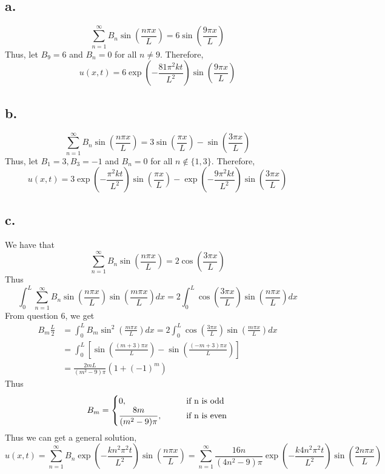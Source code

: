 \documentclass[11pt]{article}
\theoremstyle{mystyle}
\theoremstyle{definition}
\begin{document}
\subsection*{a.}
\[
  \sum_{n=1}^\infty B_n \sin\left( \displaystyle\frac{n\pi x}{L} \right) = 6\sin\left( \displaystyle\frac{9\pi x}{L}\right) 
\]
Thus, let $B_9 = 6$ and $B_n = 0$ for all $n \ne 9$. 
Therefore, 
\[
  u(x,t) = 6 \exp \left(-\displaystyle\frac{81\pi^2kt}{L^2}\right) \sin\left( \displaystyle\frac{9\pi x}{L}\right)
\]
\subsection*{b.}
\[
  \sum_{n=1}^\infty B_n \sin\left( \displaystyle\frac{n\pi x}{L} \right) = 3\sin\left( \displaystyle\frac{\pi x}{L}\right) - \sin\left( \displaystyle\frac{3\pi x}{L}\right) 
\]
Thus, let $B_1 = 3, B_3 = -1$ and $B_n = 0$ for all $n \notin \{1,3\}$. Therefore, 
\[
  u(x,t) = 3 \exp \left(-\displaystyle\frac{\pi^2kt}{L^2}\right) \sin\left( \displaystyle\frac{\pi x}{L}\right) - \exp \left(-\displaystyle\frac{9\pi^2kt}{L^2}\right) \sin\left( \displaystyle\frac{3\pi x}{L}\right)
\]
\subsection*{c.}
We have that 
\[
  \sum_{n=1}^\infty B_n \sin\left( \displaystyle\frac{n\pi x}{L} \right) = 2 \cos \left( \displaystyle\frac{3\pi x}{L} \right) 
\]
Thus 
\[
  \int_0^L \sum_{n=1}^\infty B_n \sin\left( \displaystyle\frac{n\pi x}{L} \right) \sin\left( \displaystyle\frac{m\pi x}{L} \right) dx= 2  \int_0^L \cos \left( \displaystyle\frac{3\pi x}{L} \right) \sin\left( \displaystyle\frac{n\pi x}{L} \right) dx
\]
From question 6, we get 
\begin{align*}  
  B_m \displaystyle\frac{L}{2} 
  &= \int_0^L B_m \sin^2 \left(\displaystyle\frac{m\pi x}{L}\right) dx = 2 \int_0^L \cos\left(\displaystyle\frac{3\pi x}{L} \right) \sin \left(\displaystyle\frac{m \pi x}{L}\right) dx \\
  &= \int_0^L \left[\sin\left(\displaystyle\frac{(m+3)\pi x}{L}\right)- \sin\left(\displaystyle\frac{(-m+3)\pi x}{L}\right)\right] \\
  &= \displaystyle\frac{2mL}{(m^2-9)\pi} (1+ (-1)^m)
\end{align*}
Thus 
\[
  B_m =
  \begin{cases}
    0, \indent &\text{ if n is odd} \\
    \displaystyle\frac{8m}{(m^2-9)\pi}, \indent &\text{ if n is even}
  \end{cases}
\]
Thus we can get a general solution, 
\[
  u(x,t) = \sum_{n=1}^\infty B_n \exp\left(-\displaystyle\frac{kn^2\pi^2 t}{L^2}\right) \sin\left(\displaystyle\frac{n\pi x}{L}\right) = \sum_{n=1}^\infty \displaystyle\frac{16n}{(4n^2-9)\pi} \exp \left( -\displaystyle\frac{k4n^2\pi^2 t}{L^2}\right) \sin\left(\displaystyle\frac{2n\pi x}{L}\right)
\]
\end{document}
